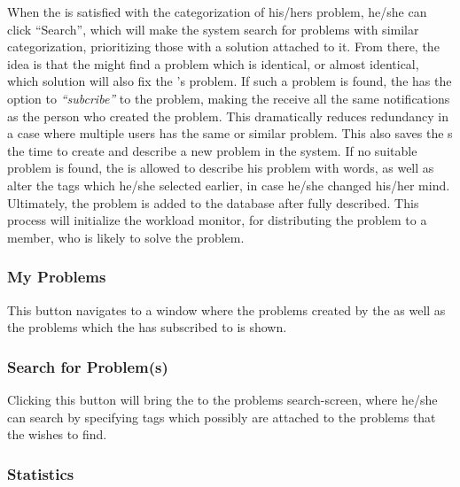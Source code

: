 When the \aclient[] is satisfied with the categorization of his/hers problem, he/she can click ``Search'', which will make the system search for problems with similar categorization, prioritizing those with a solution attached to it.
From there, the idea is that the \aclient[] might find a problem which is identical, or almost identical, which solution will also fix the \aclient 's problem. If such a problem is found, the \aclient[] has the option to \textit{``subcribe''} to the problem, making the \aclient[] receive all the same notifications as the person who created the problem.
This dramatically reduces redundancy in a case where multiple users has the same or similar problem.
This also saves the \aclient s the time to create and describe a new problem in the system.
If no suitable problem is found, the \aclient[] is allowed to describe his problem with words, as well as alter the tags which he/she selected earlier, in case he/she changed his/her mind.
Ultimately, the problem is added to the database after fully described. This process will initialize the workload monitor, for distributing the problem to a \astaff[] member, who is likely to solve the problem.

\subsubsection{My Problems}
This button navigates to a window where the problems created by the \aclient[] as well as the problems which the \aclient[] has subscribed to is shown.

\subsubsection{Search for Problem(s)}
Clicking this button will bring the \aclient[] to the problems search-screen, where he/she can search by specifying tags which possibly are attached to the problems that the \aclient[] wishes to find.

\subsubsection{Statistics}

